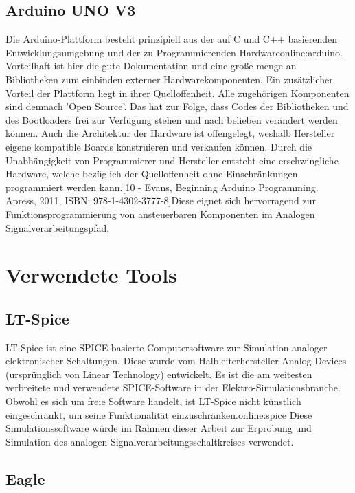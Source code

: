 \subsection{Arduino UNO V3}
\label{subsec:Unterabschnitt12}

Die Arduino-Plattform besteht prinzipiell aus der auf C und C++ basierenden Entwicklungsumgebung und der zu Programmierenden Hardware\gls{online:arduino}. Vorteilhaft ist hier die gute Dokumentation und eine große menge an Bibliotheken zum einbinden externer Hardwarekomponenten. Ein zusätzlicher Vorteil der Plattform liegt in ihrer Quelloffenheit. Alle zugehörigen Komponenten sind demnach 'Open Source'. Das hat zur Folge, dass Codes der Bibliotheken und des Bootloaders frei zur Verfügung stehen und nach belieben verändert werden können. Auch die Architektur der Hardware ist offengelegt, weshalb Hersteller eigene kompatible Boards konstruieren und verkaufen können. Durch die Unabhängigkeit von Programmierer und Hersteller entsteht eine erschwingliche Hardware, welche bezüglich der Quelloffenheit ohne Einschränkungen programmiert werden kann.[10 - Evans, Beginning Arduino Programming. Apress, 2011, ISBN: 978-1-4302-3777-8]Diese eignet sich hervorragend zur Funktionsprogrammierung von ansteuerbaren Komponenten im Analogen Signalverarbeitungspfad.

\section{Verwendete Tools}       
\subsection{LT-Spice}
\label{subsec:Unterabschnitt12}
LT-Spice ist eine SPICE-basierte Computersoftware zur Simulation analoger elektronischer Schaltungen. Diese wurde vom Halbleiterhersteller Analog Devices (ursprünglich von Linear Technology) entwickelt. Es ist die am weitesten verbreitete und verwendete SPICE-Software in der Elektro-Simulationsbranche. Obwohl es sich um freie Software handelt, ist LT-Spice nicht künstlich eingeschränkt, um seine Funktionalität einzuschränken.\gls{online:spice} Diese Simulationssoftware würde im Rahmen dieser Arbeit zur Erprobung und Simulation des analogen Signalverarbeitungsschaltkreises verwendet.

\subsection{Eagle}
\label{subsec:Unterabschnitt12}

